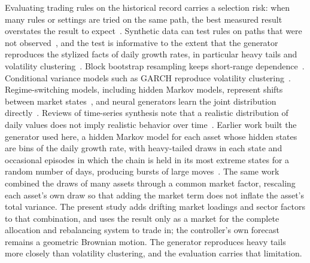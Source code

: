 Evaluating trading rules on the historical record carries a selection risk: when many rules or settings are tried on
the same path, the best measured result overstates the result to expect~\cite{baileyEtAl2014, harveyLiu2015}.
Synthetic data can test rules on paths that were not observed~\cite{assefaEtAl2020, jordonEtAl2022}, and the test is
informative to the extent that the generator reproduces the stylized facts of daily growth rates, in particular
heavy tails and volatility clustering~\cite{mandelbrot1963, cont2001}. Block bootstrap resampling keeps short-range
dependence~\cite{politisRomano1994}. Conditional variance models such as GARCH reproduce volatility
clustering~\cite{engle1982, bollerslev1986}. Regime-switching models, including hidden Markov models, represent
shifts between market states~\cite{hamilton1989}, and neural generators learn the joint distribution
directly~\cite{wieseEtAl2020}. Reviews of time-series synthesis note that a realistic distribution of daily values
does not imply realistic behavior over time~\cite{stengerEtAl2024}. Earlier work built the generator used here, a
hidden Markov model for each asset whose hidden states are bins of the daily growth rate, with heavy-tailed draws in
each state and occasional episodes in which the chain is held in its most extreme states for a random number of
days, producing bursts of large moves~\cite{alswaidan2026variance}. The same work combined the draws of many assets
through a common market factor, rescaling each asset's own draw so that adding the market term does not inflate the
asset's total variance. The present study adds drifting market loadings and sector factors to that combination, and
uses the result only as a market for the complete allocation and rebalancing system to trade in; the controller's
own forecast remains a geometric Brownian motion. The generator reproduces heavy tails more closely than volatility
clustering, and the evaluation carries that limitation.


